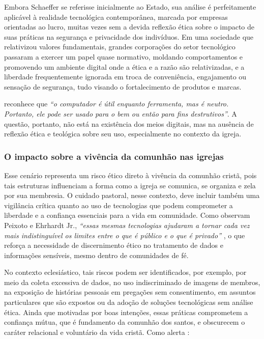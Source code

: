 Embora Schaeffer se referisse inicialmente ao Estado, sua análise é perfeitamente aplicável à realidade tecnológica contemporânea, marcada por empresas orientadas ao lucro, muitas vezes sem a devida reflexão ética sobre o impacto de suas práticas na segurança e privacidade dos indivíduos. Em uma sociedade que relativizou valores fundamentais, grandes corporações do setor tecnológico passaram a exercer um papel quase normativo, moldando comportamentos e promovendo um ambiente digital onde a ética e a razão são relativizadas, e a liberdade frequentemente ignorada em troca de conveniência, engajamento ou sensação de segurança, tudo visando o fortalecimento de produtos e marcas.

 reconhece que \textit{``o computador é útil enquanto ferramenta, mas é neutro. Portanto, ele pode ser usado para o bem ou então para fins destrutivos''}. A questão, portanto, não está na existência dos meios digitais, mas na ausência de reflexão ética e teológica sobre seu uso, especialmente no contexto da igreja.

\subsubsection{O impacto sobre a vivência da comunhão nas igrejas}

Esse cenário representa um risco ético direto à vivência da comunhão cristã, pois tais estruturas influenciam a forma como a igreja se comunica, se organiza e zela por sua membresia. O cuidado pastoral, nesse contexto, deve incluir também uma vigilância crítica quanto ao uso de tecnologias que podem comprometer a liberdade e a confiança essenciais para a vida em comunidade. Como observam Peixoto e Ehrhardt Jr., \textit{``essas mesmas tecnologias ajudaram a tornar cada vez mais indistinguível os limites entre o que é público e o que é privado''} \cite[p.~43]{peixoto2020ressignificacao}, o que reforça a necessidade de discernimento ético no tratamento de dados e informações sensíveis, mesmo dentro de comunidades de fé.

No contexto eclesiástico, tais riscos podem ser identificados, por exemplo, por meio da coleta excessiva de dados, no uso indiscriminado de imagens de membros, na exposição de histórias pessoais em pregações sem consentimento, em assuntos particulares que são expostos ou da adoção de soluções tecnológicas sem análise ética. Ainda que motivadas por boas intenções, essas práticas comprometem a confiança mútua, que é fundamento da comunhão dos santos, e obscurecem o caráter relacional e voluntário da vida cristã. Como alerta :

